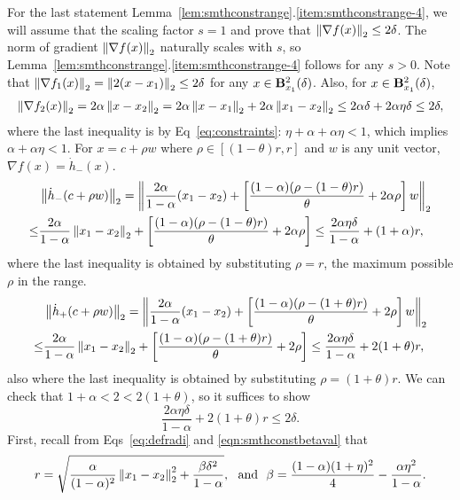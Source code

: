For the last statement Lemma~\ref{lem:smthconstrange}.\ref{item:smthconstrange-4}, we will assume that the scaling factor $s = 1$ and prove that
$\left\|{\nabla f(x)}\right\|_2 \leq 2\delta$. The norm of gradient $\left\|{\nabla f(x)}\right\|_2$ naturally scales with $s$, so Lemma~\ref{lem:smthconstrange}.\ref{item:smthconstrange-4} follows for any $s > 0$.
Note that $\left\|{\nabla f_{1}(x)}\right\|_2 = \left\|{2(x-x_1)}\right\|_2 \leq 2\delta$ for any $x \in \mathbf{B}^2_{x_1}({\delta})$.
Also, for $x \in \mathbf{B}^2_{x_1}({\delta})$,
\begin{align*}
	\left\|{\nabla f_{2}(x)}\right\|_2 = 2\alpha \left\|{x-x_2}\right\|_2 = 2\alpha \left\|{x-x_1}\right\|_2 + 2\alpha\left\|{x_1-x_2}\right\|_2 \leq 2\alpha \delta + 2\alpha \eta\delta \leq 2\delta,
\end{align*}
where the last inequality is by Eq~\eqref{eq:constraints}: $\eta+\alpha+\alpha\eta < 1$, which implies $\alpha+\alpha\eta < 1$.
For $x = c + \rho w$ where $\rho \in [(1-\theta)r, r]$ and $w$ is any unit vector, $\nabla f(x) = \dot h_-(x)$.
\begin{align*}
	&\left\|{\dot h_-(c + \rho w)}\right\|_2
	= \left\|{ \frac{2\alpha}{1-\alpha}(x_1-x_2) + \left [ \frac{(1-\alpha)(\rho-(1-\theta)r)}{\theta} + 2\alpha\rho \right] w}\right\|_2\\
	\leq& \frac{2\alpha}{1-\alpha}\left\|{x_1-x_2}\right\|_2 + \left [ \frac{(1-\alpha)(\rho-(1-\theta)r)}{\theta} + 2\alpha\rho \right]
	\leq 
	\frac{2\alpha \eta \delta}{1-\alpha} + (1+\alpha) r,
\end{align*}
where the last inequality is obtained by substituting $\rho = r$, the maximum possible $\rho$ in the range.
\begin{align*}
	&\left\|{\dot h_+(c + \rho w)}\right\|_2 
	= \left\|{ \frac{2\alpha}{1-\alpha}(x_1-x_2) + \left [ \frac{(1-\alpha)(\rho-(1+\theta)r)}{\theta} + 2\rho \right] w}\right\|_2\\
	\leq& \frac{2\alpha}{1-\alpha}\left\|{x_1-x_2}\right\|_2 + \left [ \frac{(1-\alpha)(\rho-(1+\theta)r)}{\theta} + 2\rho \right]
	\leq \frac{2\alpha \eta \delta}{1-\alpha} + 2(1+\theta) r,
\end{align*}
also where the last inequality is obtained by substituting $\rho = (1+\theta)r$.
We can check that $1+\alpha < 2 < 2(1+\theta)$, so it suffices to show
\begin{equation}
\label{eq:smthconstrange-4goal}
\frac{2\alpha \eta \delta}{1-\alpha} + 2(1+\theta) r \leq 2\delta.
\end{equation}
First, recall from Eqs~\eqref{eq:defradi} and \eqref{eqn:smthconstbetaval} that
\begin{equation*}
	r = \sqrt{\frac{\alpha}{(1-\alpha)^2} \left\|{x_1-x_2}\right\|_2^2 + \frac{\beta\delta^2}{1-\alpha}},~\text{ and }~
	\beta = \frac{(1-\alpha)(1+\eta)^2}{4} - \frac{\alpha \eta^2}{1-\alpha}.
\end{equation*}
